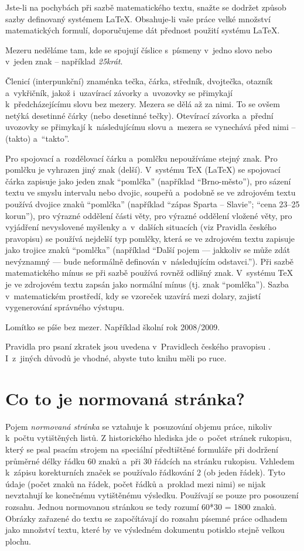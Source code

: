\documentclass[english,cover]{fitthesis} %
\begin{document}
Jste-li na pochybách při sazbě matematického textu, snažte se dodržet způsob sazby definovaný systémem LaTeX. Obsahuje-li vaše práce velké množství matematických formulí, doporučujeme dát přednost použití systému LaTeX.

Mezeru neděláme tam, kde se spojují číslice s~písmeny v~jedno slovo nebo v~jeden znak -- například {\it 25krát}.

Členicí (interpunkční) znaménka tečka, čárka, středník, dvojtečka, otazník a~vykřičník, jakož i~uzavírací závorky a~uvozovky se přimykají k~předcházejícímu slovu bez mezery. Mezera se dělá až za nimi. To se ovšem netýká desetinné čárky (nebo desetinné tečky). Otevírací závorka a~přední uvozovky se přimykají k~následujícímu slovu a~mezera se vynechává před nimi -- (takto) a~``takto''.

Pro spojovací a~rozdělovací čárku a~pomlčku nepoužíváme stejný znak. Pro pomlčku je vyhrazen jiný znak (delší). V~systému TeX (LaTeX) se spojovací čárka zapisuje jako jeden znak ``pomlčka'' (například ``Brno-město''), pro sázení textu ve smyslu intervalu nebo dvojic, soupeřů a~podobně se ve zdrojovém textu používá dvojice znaků ``pomlčka'' (například ``zápas Sparta -- Slavie''; ``cena 23--25 korun''), pro výrazné oddělení části věty, pro výrazné oddělení vložené věty, pro vyjádření nevyslovené myšlenky a~v~dalších situacích (viz Pravidla českého pravopisu) se používá nejdelší typ pomlčky, která se ve zdrojovém textu zapisuje jako trojice znaků ``pomlčka'' (například ``Další pojem --- jakkoliv se může zdát nevýznamný --- bude neformálně definován v~následujícím odstavci.''). Při sazbě matematického mínus se při sazbě používá rovněž odlišný znak. V~systému TeX je ve zdrojovém textu zapsán jako normální mínus (tj. znak ``pomlčka''). Sazba v~matematickém prostředí, kdy se vzoreček uzavírá mezi dolary, zajistí vygenerování správného výstupu.

Lomítko se píše bez mezer. Například školní rok 2008/2009.

Pravidla pro psaní zkratek jsou uvedena v~Pravidlech českého pravopisu \cite{Pravidla}. I~z~jiných důvodů je vhodné, abyste tuto knihu měli po ruce. 


\section{Co to je normovaná stránka?}
Pojem {\it normovaná stránka} se vztahuje k~posuzování objemu práce, nikoliv k~počtu vytištěných listů. Z historického hlediska jde o~počet stránek rukopisu, který se psal psacím strojem na speciální předtištěné formuláře při dodržení průměrné délky řádku 60 znaků a~při 30 řádcích na stránku rukopisu. Vzhledem k~zápisu korekturních značek se používalo řádkování 2 (ob jeden řádek). Tyto údaje (počet znaků na řádek, počet řádků a~proklad mezi nimi) se nijak nevztahují ke konečnému vytištěnému výsledku. Používají se pouze pro posouzení rozsahu. Jednou normovanou stránkou se tedy rozumí 60*30 = 1800 znaků. Obrázky zařazené do textu se započítávají do rozsahu písemné práce odhadem jako množství textu, které by ve výsledném dokumentu potisklo stejně velkou plochu.
\end{document}
